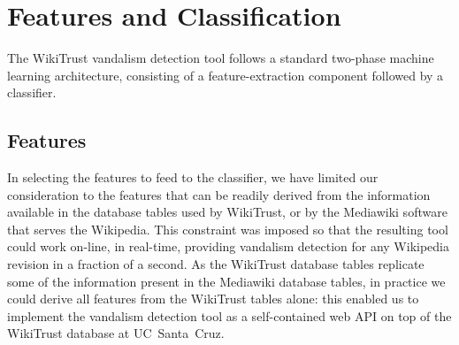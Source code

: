 \newcommand{\sign}{{{\textrm{sign}}}}

\section{Features and Classification}

The WikiTrust vandalism detection tool follows a standard two-phase machine learning architecture, consisting of a feature-extraction component followed by a classifier.

\subsection{Features}

In selecting the features to feed to the classifier, we have limited our consideration to the features that can be readily derived from the information available in the database tables used by WikiTrust, or by the Mediawiki software that serves the Wikipedia.
This constraint was imposed so that the resulting tool could work on-line, in real-time, providing vandalism detection for any Wikipedia revision in a fraction of a second.
As the WikiTrust database tables replicate some of the information present in the Mediawiki database tables, in practice we could derive all features from the WikiTrust tables alone: this enabled us to implement the vandalism detection tool as a self-contained web API on top of the WikiTrust database at UC~Santa~Cruz.

